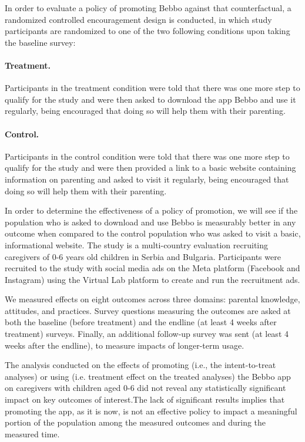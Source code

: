 In order to evaluate a policy of promoting Bebbo against that counterfactual, a randomized controlled encouragement design is conducted, in which study participants are randomized to one of the two following conditions upon taking the baseline survey:

\paragraph{Treatment.} Participants in the treatment condition were told that there was one more step to qualify for the study and were then asked to download the app Bebbo and use it regularly, being encouraged that doing so will help them with their parenting.
\paragraph{Control.} Participants in the control condition were told that there was one more step to qualify for the study and were then provided a link to a basic website containing information on parenting and asked to visit it regularly, being encouraged that doing so will help them with their parenting.

\vspace{2cm}

In order to determine the effectiveness of a policy of promotion, we will see if the population who is asked to download and use Bebbo is measurably better in any outcome when compared to the control population who was asked to visit a basic, informational website. The study is a multi-country evaluation recruiting caregivers of 0-6 years old children in Serbia and Bulgaria. Participants were recruited to the study with social media ads on the Meta platform (Facebook and Instagram) using the Virtual Lab platform to create and run the recruitment ads.

We measured effects on eight outcomes across three domains: parental knowledge, attitudes, and practices. Survey questions measuring the outcomes are asked at both the baseline (before treatment) and the endline (at least 4 weeks after treatment) surveys. Finally, an additional follow-up survey was sent (at least 4 weeks after the endline), to measure impacts of longer-term usage.

The analysis conducted on the effects of promoting (i.e., the intent-to-treat analyses) or using (i.e. treatment effect on the treated analyses) the Bebbo app on caregivers with children aged 0-6 did not reveal any statistically significant impact on key outcomes of interest.The lack of significant results implies that promoting the app, as it is now, is not an effective policy to impact a meaningful portion of the population among the measured outcomes and during the measured time.

